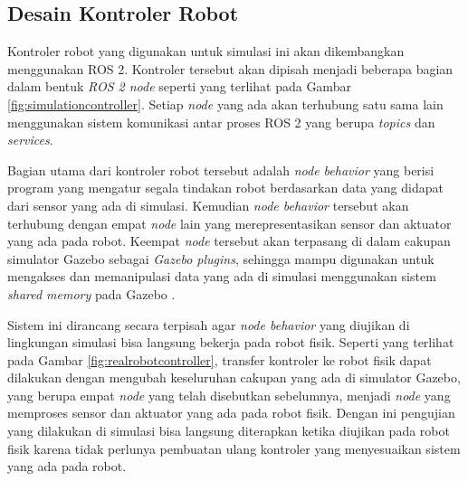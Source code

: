 \subsection{Desain Kontroler Robot}
\label{subsec:controllerdesign}



Kontroler robot yang digunakan untuk simulasi ini akan dikembangkan menggunakan ROS 2.
Kontroler tersebut akan dipisah menjadi beberapa bagian dalam bentuk \emph{ROS 2 node} seperti yang terlihat pada Gambar \ref{fig:simulationcontroller}.
Setiap \emph{node} yang ada akan terhubung satu sama lain menggunakan sistem komunikasi antar proses ROS 2 yang berupa \emph{topics} dan \emph{services}.

Bagian utama dari kontroler robot tersebut adalah \emph{node behavior} yang berisi program yang mengatur segala tindakan robot berdasarkan data yang didapat dari sensor yang ada di simulasi.
Kemudian \emph{node behavior} tersebut akan terhubung dengan empat \emph{node} lain yang merepresentasikan sensor dan aktuator yang ada pada robot.
Keempat \emph{node} tersebut akan terpasang di dalam cakupan simulator Gazebo sebagai \emph{Gazebo plugins},
  sehingga mampu digunakan untuk mengakses dan memanipulasi data yang ada di simulasi menggunakan sistem \emph{shared memory} pada Gazebo \citep{gazeboplugins}.



Sistem ini dirancang secara terpisah agar \emph{node behavior} yang diujikan di lingkungan simulasi bisa langsung bekerja pada robot fisik.
Seperti yang terlihat pada Gambar \ref{fig:realrobotcontroller},
  transfer kontroler ke robot fisik dapat dilakukan dengan mengubah keseluruhan cakupan yang ada di simulator Gazebo,
  yang berupa empat \emph{node} yang telah disebutkan sebelumnya,
  menjadi \emph{node} yang memproses sensor dan aktuator yang ada pada robot fisik.
Dengan ini pengujian yang dilakukan di simulasi bisa langsung diterapkan ketika diujikan pada robot fisik karena tidak perlunya pembuatan ulang kontroler yang menyesuaikan sistem yang ada pada robot.

